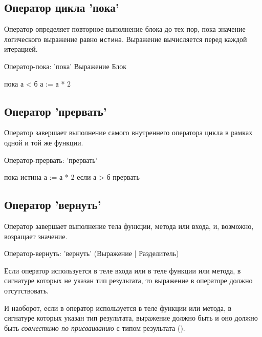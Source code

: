 \hypertarget{while-stmt}{%
\subsection{Оператор цикла 'пока' }\label{stmt:while-stmt}}

Оператор  определяет повторное выполнение блока до тех пор, пока значение логического выражение равно \verb+истина+. 
Выражение вычисляется перед каждой итерацией.

\begin{Grammar}
Оператор-пока: 'пока' Выражение Блок 
\end{Grammar}

\begin{Trivil}
пока а < б {
    а := а * 2
}
\end{Trivil}

\hypertarget{break-stmt}{%
\subsection{Оператор 'прервать'}\label{stmt:break-stmt}}

Оператор  завершает выполнение самого внутреннего оператора цикла в рамках одной и той же функции.

\begin{Grammar}
Оператор-прервать: 'прервать' 
\end{Grammar}

\begin{Trivil}
пока истина {
    а := а * 2
    если а > б { прервать }
}
\end{Trivil}

\hypertarget{return-stmt}{%
\subsection{Оператор 'вернуть'}\label{stmt:return-stmt}}

Оператор  завершает выполнение тела функции, метода или входа, и, возможно, возращает значение.

\begin{Grammar}
Оператор-вернуть: 'вернуть'  (Выражение | Разделитель)
\end{Grammar}

Если оператор  используется в теле входа или в теле функции или метода, в сигнатуре которых не указан тип результата, 
то выражение в операторе должно отсутствовать.

И наоборот, если в оператор используется в теле функции или метода, в сигнатуре которых указан тип результата, выражение должно быть и 
оно должно быть \emph{совместимо по присваиванию} с типом результата ().

